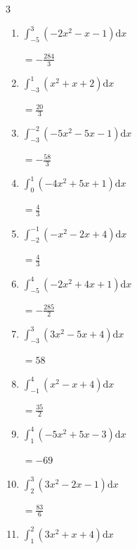 \begin{multicols}{3}
\begin{enumerate}
        $\displaystyle =-\frac{298}{3}$

  \item $\displaystyle \int_{-5}^{3}\left( -2x^{2}-x-1 \right) \mathrm{d}x$

        $\displaystyle =-\frac{284}{3}$

  \item $\displaystyle \int_{-3}^{1}\left( x^{2}+x+2 \right) \mathrm{d}x$

        $\displaystyle =\frac{20}{3}$

  \item $\displaystyle \int_{-3}^{-2}\left( -5x^{2}-5x-1 \right) \mathrm{d}x$

        $\displaystyle =-\frac{58}{3}$

  \item $\displaystyle \int_{0}^{1}\left( -4x^{2}+5x+1 \right) \mathrm{d}x$

        $\displaystyle =\frac{4}{3}$

\columnbreak %

\resetques

  \item $\displaystyle \int_{-2}^{-1}\left( -x^{2}-2x+4 \right) \mathrm{d}x$

        $\displaystyle =\frac{4}{3}$

  \item $\displaystyle \int_{-5}^{4}\left( -2x^{2}+4x+1 \right) \mathrm{d}x$

        $\displaystyle =-\frac{285}{2}$

  \item $\displaystyle \int_{-3}^{3}\left( 3x^{2}-5x+4 \right) \mathrm{d}x$

        $\displaystyle =58$

  \item $\displaystyle \int_{-1}^{4}\left( x^{2}-x+4 \right) \mathrm{d}x$

        $\displaystyle =\frac{35}{2}$

  \item $\displaystyle \int_{1}^{4}\left( -5x^{2}+5x-3 \right) \mathrm{d}x$

        $\displaystyle =-69$

\columnbreak %

  \item $\displaystyle \int_{2}^{3}\left( 3x^{2}-2x-1 \right) \mathrm{d}x$

        $\displaystyle =\frac{83}{6}$

  \item $\displaystyle \int_{1}^{2}\left( 3x^{2}+x+4 \right) \mathrm{d}x$


\end{enumerate}
\end{multicols}
